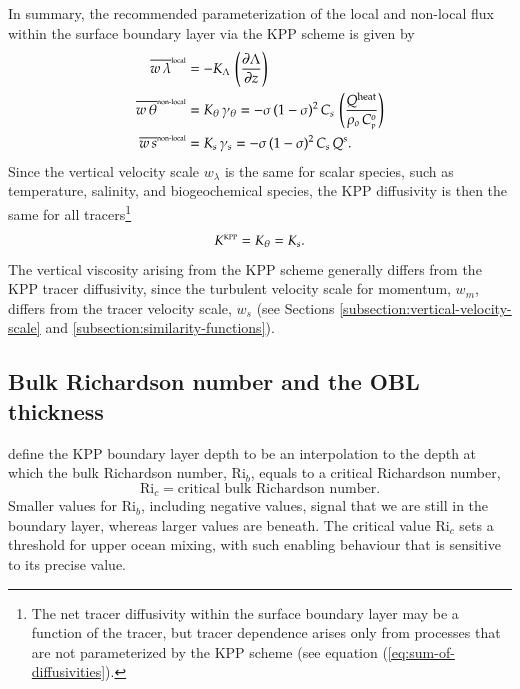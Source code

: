 In summary, the recommended parameterization of the local and
non-local flux within the surface boundary layer via the KPP scheme is
given by
\begin{subequations}
\begin{align}
\overline{w \, \lambda}^{\mbox{\tiny local}} &= -K_{\Lambda}  \, \left( \frac{\partial \Lambda}{\partial z} \right)
 \\
\overline{w \, \theta}^{\mbox{\tiny non-local}} &= K_{\theta}  \, \gamma_{\theta} = 
 - \sigma \, (1-\sigma)^{2} \, C_{s} \, \left( \frac{ Q^{\mbox{\scriptsize heat}}}{ \rho_{o}  \, C_{\mbox{\tiny p}}^{o} } \right)
\label{eq:non-local-flux-kpp-param-temp-simple}
\\
\overline{w \, s}^{\mbox{\tiny non-local}} &= K_{s}  \, \gamma_{s}  = 
 -\sigma \, (1-\sigma)^{2}  \, C_{s} \,  Q^{s}.
\label{eq:non-local-flux-kpp-param-scalar-simple}
\end{align}
\end{subequations}
Since the vertical velocity scale $w_{\lambda}$ is the same for scalar
species, such as temperature, salinity, and biogeochemical species,
the KPP diffusivity is then the same for all tracers\footnote{The net
  tracer diffusivity within the surface boundary layer may be a
  function of the tracer, but tracer dependence arises only from
  processes that are not parameterized by the KPP scheme (see equation
  (\ref{eq:sum-of-diffusivities}).}
\begin{equation}
  K^{\mbox{\tiny KPP}}  = K_{\theta} = K_{s}.
\end{equation} 
The vertical viscosity arising from the KPP scheme generally differs
from the KPP tracer diffusivity, since the turbulent velocity scale
for momentum, $w_{m}$, differs from the tracer velocity scale, $w_{s}$
(see Sections \ref{subsection:vertical-velocity-scale} and
\ref{subsection:similarity-functions}).


\subsection{Bulk Richardson number and the OBL thickness}
\label{subsection:kpp-obl-thickness}

\cite{LargeKPP} define the KPP boundary layer depth to be an
interpolation to the depth at which the bulk Richardson number,
$\mbox{Ri}_{b}$, equals to a critical Richardson number,
\begin{equation}
 \mbox{Ri}_{c}  = \mbox{critical bulk Richardson number}. 
\label{eq:critical-bulk-richardson-number}
\end{equation}
Smaller values for $\mbox{Ri}_{b}$, including negative values, signal
that we are still in the boundary layer, whereas larger values are
beneath.  The critical value $\mbox{Ri}_{c}$ sets a threshold for
upper ocean mixing, with such enabling behaviour that is sensitive to
its precise value.

